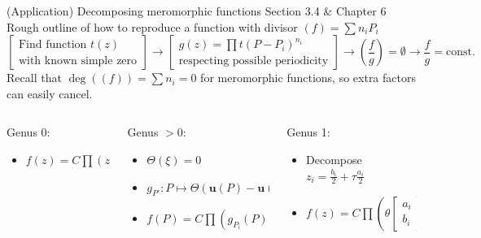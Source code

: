 \documentclass[11pt,aspectratio=169]{beamer}
\begin{document}
\begin{frame}{(Application) Decomposing meromorphic functions}{\tiny \cite{Cha22} Section 3.4 \& \cite{Ber06} Chapter 6}
    Rough outline of how to reproduce a function with divisor $(f) = \sum n_i P_i$
    \[ \begin{bmatrix}\text{Find function }t(z) \\ \text{with known simple zero}\end{bmatrix} \rightarrow \begin{bmatrix} g(z)=\prod t(P-P_i)^{n_i} \\ \text{respecting possible periodicity}\end{bmatrix} \rightarrow \left(\frac{f}{g}\right) = \emptyset \rightarrow \frac{f}{g} = \text{const.} \]
    Recall that $\deg((f)) = \sum n_i = 0$ for meromorphic functions, so extra factors can easily cancel.
    \vspace{+1em}
    \begin{columns}[t]
        \begin{column}{0.3\textwidth}
            Genus 0:
            \begin{itemize}
                \item $f(z) = C \prod (z-z_i)^{n_i}$
            \end{itemize}
        \end{column}

        \begin{column}{0.3\textwidth}
            Genus $>0$:
            \begin{itemize}
                \item $\Theta(\xi) = 0$
                \item $g_{P'} : P \mapsto \Theta(\mathbf{u}(P)-\mathbf{u}(P')+\xi)$
                \item $f(P) = C \prod \left(g_{P_i}(P)\right)^{n_i}$
            \end{itemize}
        \end{column}

        \begin{column}{0.35\textwidth}
            Genus 1:
            \begin{itemize}
                \item Decompose $z_i = \frac{b_i}{2} + \tau \frac{a_i}{2}$
                \item $f(z) = C \prod \left(\theta\begin{bmatrix}a_i \\ b_i\end{bmatrix}(z)\right)^{n_i}$
            \end{itemize}
        \end{column}
    \end{columns}
\end{frame}
\end{document}
